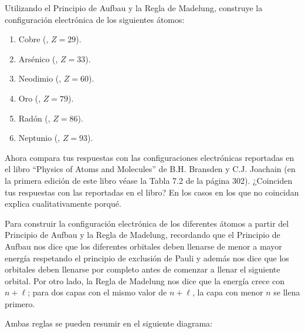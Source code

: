 \documentclass[./../main.tex]{subfiles}
\begin{document}
    \color{blue}
    \begin{exercise}
        Utilizando el Principio de Aufbau y la Regla de Madelung, construye la configuración electrónica de los siguientes átomos:

        \begin{enumerate}[threecol]
            \item Cobre (, \(Z = 29\)).
            \item Arsénico (, \(Z = 33\)).
            \item Neodimio (, \(Z = 60\)).
            \item Oro (, \(Z = 79\)).
            \item Radón (, \(Z = 86\)).
            \item Neptunio (, \(Z = 93\)).
        \end{enumerate}

        Ahora compara tus respuestas con las configuraciones electrónicas reportadas en el libro ``Physics of Atoms and Molecules''  de B.H. Bransden y C.J. Joachain (en la primera edición de este libro véase la Tabla 7.2 de la página 302).
        ¿Coinciden tus respuestas con las reportadas en el libro? En los casos en los que no coincidan explica cualitativamente porqué.

        \color{black}
        \begin{solution}
            Para construir la configuración electrónica de los diferentes átomos a partir del Principio de Aufbau y la Regla de Madelung, recordando que el Principio de Aufbau nos dice que los diferentes orbitales deben llenarse de menor a mayor energía respetando el principio de exclusión de Pauli y además nos dice que los orbitales deben llenarse por completo antes de comenzar a llenar el siguiente orbital. Por otro lado, la Regla de Madelung nos dice que la energía crece con \(n + \ell\); para dos capas con el mismo valor de \(n + \ell\), la capa con menor \(n\) se llena primero.

            Ambas reglas se pueden resumir en el siguiente diagrama:


\end{solution}
\end{exercise}
\end{document}
